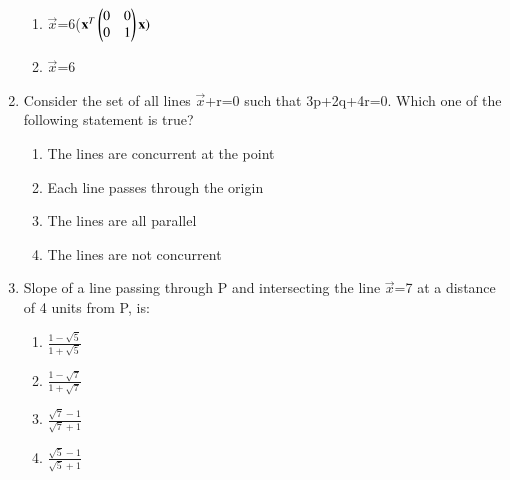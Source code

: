 \begin{enumerate}
\begin{enumerate}
     \item  {}$\vec {x}$=6($\mathbf {x}^T \begin{pmatrix} 0 & 0  \\0 & 1\end{pmatrix}\mathbf {x})$
     \item  {}$\vec {x}$=6
     \end{enumerate}
    \item Consider the set of all lines $\vec {x}$+r=0 such that 3p+2q+4r=0. Which one of the following statement is true?
    \begin{enumerate}
     \item  The lines are concurrent at the point
     \item  Each line passes through the origin
     \item  The lines are all parallel
     \item  The lines are not concurrent
     \end{enumerate}
    \item Slope of a line passing through P and intersecting the line 
    $\vec {x}$=7 at a distance of 4 units from P, is:
    \begin{enumerate}
     \item {$\frac{1-\sqrt5}{1+\sqrt5}$}
     \item {$\frac{1-\sqrt7}{1+\sqrt7}$}
     \item {$\frac{\sqrt7-1}{\sqrt7+1}$}
     \item {$\frac{\sqrt5-1}{\sqrt5+1}$}
     \end{enumerate}
\end{enumerate}

%
